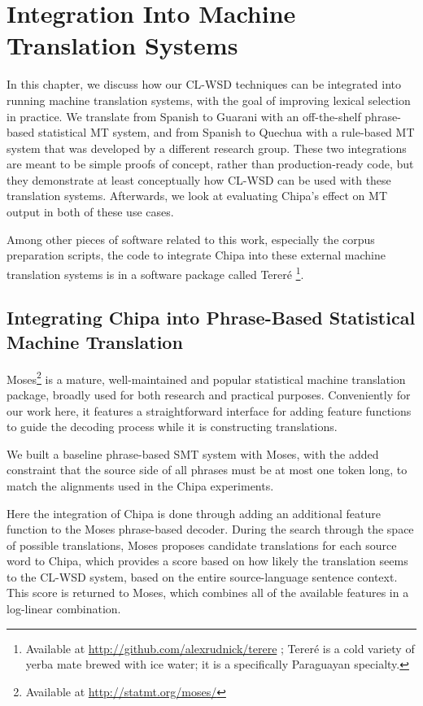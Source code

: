 \chapter{Integration Into Machine Translation Systems}
\label{chap:integration}

In this chapter, we discuss how our CL-WSD techniques can be integrated into
running machine translation systems, with the goal of improving lexical
selection in practice. We translate from Spanish to Guarani with an
off-the-shelf phrase-based statistical MT system, and from Spanish to Quechua
with a rule-based MT system that was developed by a different research group.
These two integrations are meant to be simple proofs of concept, rather than
production-ready code, but they demonstrate at least conceptually how CL-WSD
can be used with these translation systems.  Afterwards, we look at evaluating
Chipa's effect on MT output in both of these use cases.

Among other pieces of software related to this work, especially the corpus
preparation scripts, the code to integrate Chipa into these external machine
translation systems is in a software package called Tereré \footnote{Available
at \url{http://github.com/alexrudnick/terere} ; Tereré is a cold variety of
yerba mate brewed with ice water; it is a specifically Paraguayan specialty.}.

\section{Integrating Chipa into Phrase-Based Statistical Machine Translation}
Moses\footnote{Available at
\url{http://statmt.org/moses/}}\cite{koehn-EtAl:2007:PosterDemo} is a mature,
well-maintained and popular statistical machine translation package, broadly
used for both research and practical purposes. Conveniently for our work here,
it features a straightforward interface for adding feature functions to guide
the decoding process while it is constructing translations.

We built a baseline phrase-based SMT system with Moses, with the added
constraint that the source side of all phrases must be at most one token long,
to match the alignments used in the Chipa experiments.

Here the integration of Chipa is done through adding an additional feature
function to the Moses phrase-based decoder. During the search through the space
of possible translations, Moses proposes candidate translations for each source
word to Chipa, which provides a score based on how likely the translation seems
to the CL-WSD system, based on the entire source-language sentence context.
This score is returned to Moses, which combines all of the available features
in a log-linear combination.


